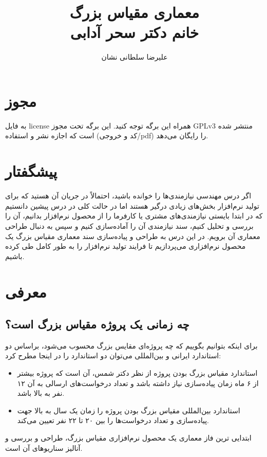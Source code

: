 \documentclass[a4paper]{article}
\title{معماری مقیاس بزرگ \\ خانم دکتر سحر آدابی}
\author{علیرضا سلطانی نشان}
\begin{document}
\maketitle
\tableofcontents

\section*{مجوز}

به فایل license همراه این برگه توجه کنید. این برگه تحت مجوز GPLv3 منتشر شده است
که اجازه نشر و استفاده (کد و خروجی/pdf) را رایگان می‌دهد.

\section{پیشگفتار}

اگر درس مهندسی نیازمندی‌ها را خوانده باشید، احتمالاً در جریان آن هستید که برای
تولید نرم‌افزار بخش‌های زیادی درگیر هستند اما در حالت کلی در درس پیشین دانستیم
که در ابتدا بایستی نیازمندی‌های مشتری یا کارفرما را از محصول نرم‌افزار بدانیم،
آن را بررسی و تحلیل کنیم، سند نیازمندی آن را آماده‌سازی کنیم و سپس به دنبال
طراحی معماری آن برویم. در این درس به طراحی و پیاده‌سازی سند معماری مقیاس بزرگ یک
محصول نرم‌افزاری می‌پردازیم تا فرایند تولید نرم‌افزار را به طور کامل طی کرده
باشیم.

\section{معرفی}

\subsection{چه زمانی یک پروژه مقیاس بزرگ است؟}

برای اینکه بتوانیم بگوییم که چه پروژه‌ای مقایس بزرگ محسوب می‌شود، براساس دو
استاندارد ایرانی و بین‌المللی می‌توان دو استاندارد را در اینجا مطرح کرد:

\begin{itemize}
    \item استاندارد مقیاس بزرگ بودن پروژه از نظر دکتر شمس، آن است که پروژه بیشتر
    از ۶ ماه زمان پیا‌ده‌سازی نیاز داشته باشد و تعداد درخواست‌های ارسالی به آن
    ۱۲ نفر به بالا باشد.
    \item استاندارد بین‌المللی مقیاس بزرگ بودن پروژه را زمان یک سال به بالا جهت
    پیاده‌سازی و تعداد درخواست‌ها را بین ۲۰ تا ۲۲ نفر تعیین می‌کند.
\end{itemize}

ابتدایی ترین فاز معماری یک محصول نرم‌افزاری مقیاس بزرگ، طراحی و بررسی و آنالیز
سناریو‌های آن است.
\end{document}
